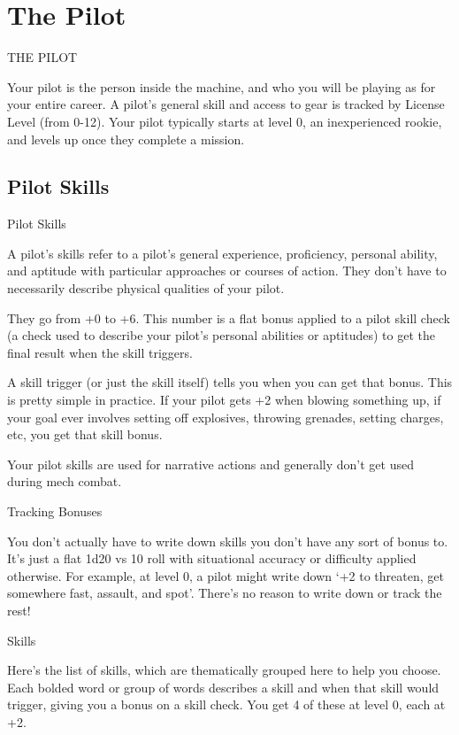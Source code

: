 \part{The Pilot}
  THE PILOT

Your pilot is the person inside the machine, and who you will be playing as for your entire career.
A pilot’s general skill and access to gear is tracked by License Level (from 0-12). Your pilot
typically starts at level 0, an inexperienced rookie, and levels up once they complete a
mission.


\chapter{Pilot Skills}

                                                   Pilot Skills

A pilot’s skills refer to a pilot’s general experience, proficiency, personal ability, and aptitude with
particular approaches or courses of action. They don’t have to necessarily describe physical
qualities of your pilot.

They go from +0 to +6. This number is a flat bonus applied to a pilot skill check (a check used to
describe your pilot’s personal abilities or aptitudes) to get the final result when the skill triggers.

A skill trigger (or just the skill itself) tells you when you can get that bonus. This is pretty simple in
practice. If your pilot gets +2 when blowing something up, if your goal ever involves setting off
explosives, throwing grenades, setting charges, etc, you get that skill bonus.

Your pilot skills are used for narrative actions and generally don’t get used during mech combat.

                                                Tracking Bonuses


You don’t actually have to write down skills you don’t have any sort of bonus to. It’s just a flat
1d20 vs 10 roll with situational accuracy or difficulty applied otherwise. For example, at level 0, a
pilot might write down ‘+2 to threaten, get somewhere fast, assault, and spot’. There’s no reason
to write down or track the rest!


                                                        Skills

Here’s the list of skills, which are thematically grouped here to help you choose. Each bolded
word or group of words describes a skill and when that skill would trigger, giving you a bonus on a
skill check. You get 4 of these at level 0, each at +2.

